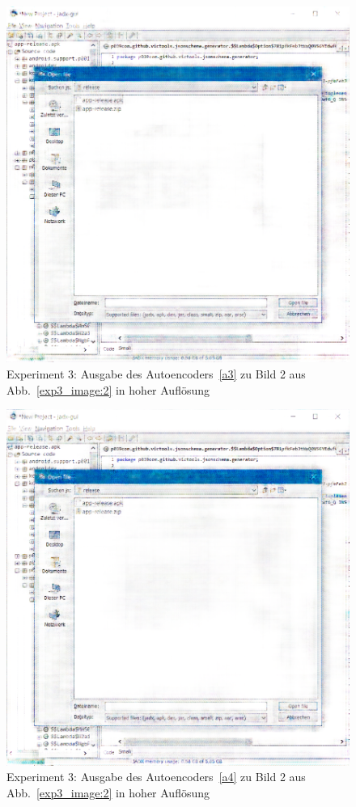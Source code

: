 \begin{figure} [ht]
  \centering
  \includegraphics[width=\textwidth]{bilder/result_exp3/2_pred_a3.png}

  \caption{Experiment 3: Ausgabe des Autoencoders~\ref{a3} zu Bild 2 aus Abb.~\ref{exp3_image:2} in hoher Auflösung}
\end{figure}

\begin{figure} [ht]
  \centering
  \includegraphics[width=\textwidth]{bilder/result_exp3/2_pred_a4.png}

  \caption{Experiment 3: Ausgabe des Autoencoders~\ref{a4} zu Bild 2 aus Abb.~\ref{exp3_image:2} in hoher Auflösung}
\end{figure}



